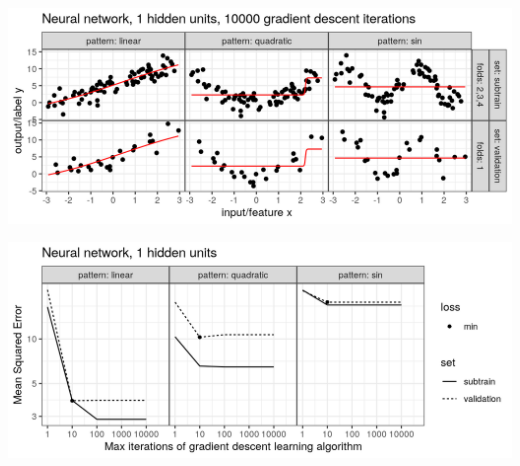 \begin{frame}
  \includegraphics[width=\textwidth]{figure-overfitting-pred-units=1-maxit=10000.png}
\end{frame}


\begin{frame}
  \includegraphics[width=\textwidth]{figure-overfitting-data-loss-1.png}
\end{frame}

